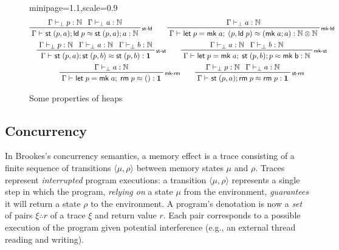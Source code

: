 \documentclass[acmsmall,screen,anonymous,review]{acmart}
\newcommand{\mb}[1]{\ensuremath{\mathbf{#1}}}
\newcommand{\ms}[1]{\ensuremath{\mathsf{#1}}}
\newcommand{\nats}{\mathbb{N}}
\newcommand{\letexpr}[3]{\ensuremath{\ms{let}\;#1 = #2;\;#3}}
\newcommand{\rle}[1]{{\scriptsize\textsf{#1}}}
\newcommand{\hasty}[4]{#1 \vdash_{#2} #3: {#4}}
\newcommand{\teqv}{\approx}
\newcommand{\tmeq}[5]{#1 \vdash_{#2} #3 \teqv #4 : {#5}}
\newcommand{\tret}[2]{#1 \therefore #2}
\begin{document}
\begin{figure}
  \begin{adjustbox}{minipage=1.1\textwidth,scale=0.9}
  \begin{gather*}
    \prftree[r]{\rle{st-ld}}
      {\hasty{\Gamma}{\bot}{p}{\nats}}
      {\hasty{\Gamma}{\bot}{a}{\nats}}
      {\tmeq{\Gamma}{}{\ms{st}\;(p, a) ; \ms{ld}\;p}{\ms{st}\;(p, a) ; a}{\nats}}
    \qquad
    \prftree[r]{\rle{mk-ld}}
      {\hasty{\Gamma}{\bot}{a}{\nats}}
      {\tmeq{\Gamma}{}{\letexpr{p}{\ms{mk}\;a}{(p, \ms{ld}\;p)}}
                                                 {(\ms{mk}\;a; a)}
                                                 {\nats \otimes \nats}}
    \\
    \prftree[r]{\rle{st-st}}
      {\hasty{\Gamma}{\bot}{p}{\nats}}
      {\hasty{\Gamma}{\bot}{a}{\nats}}
      {\hasty{\Gamma}{\bot}{b}{\nats}}
      {\tmeq{\Gamma}{}{\ms{st}\;(p, a) ; \ms{st}\;(p, b)}{\ms{st}\;(p, b)}{\mb{1}}}
    \qquad
    \prftree[r]{\rle{mk-st}}
      {\hasty{\Gamma}{\bot}{a}{\nats}}
      {\hasty{\Gamma}{\bot}{b}{\nats}}
      {\tmeq{\Gamma}{}{\letexpr{p}{\ms{mk}\;a}{\ms{st}\;(p, b) ; p}}
                                                  {\ms{mk\;b}}
                                                  {\nats}}
    \\
    \prftree[r]{\rle{mk-rm}}
      {\hasty{\Gamma}{\bot}{a}{\nats}}
      {\tmeq{\Gamma}{}{\letexpr{p}{\ms{mk}\;a}{\ms{rm}\;p}}{()}{\mb{1}}}
    \qquad
    \prftree[r]{\rle{st-rm}}
      {\hasty{\Gamma}{\bot}{p}{\nats}}
      {\hasty{\Gamma}{\bot}{a}{\nats}}
      {\tmeq{\Gamma}{}{\ms{st}\;(p, a) ; \ms{rm}\;p}{\ms{rm}\;p}{\mb{1}}}
    \\
  \end{gather*}
  \end{adjustbox}
  \caption{Some properties of heaps}
  \label{fig:heap-eqns}
  \Description{}
\end{figure}

\subsection{Concurrency}

In Brookes's \cite{brookes-full-abstraction-96} concurrency semantics, a memory effect
is a trace consisting of a finite sequence of transitions $\langle \mu, \rho \rangle$ 
between memory states $\mu$ and $\rho$.
%
Traces represent \emph{interrupted} program executions: a transition $\langle \mu, \rho
\rangle$ represents a single step in which the program, \emph{relying on} a state $\mu$ from the
environment, \emph{guarantees} it will return a state $\rho$ to the environment.
%
A program's denotation is now a \emph{set} of pairs $\tret{\xi}{r}$ of a trace $\xi$ and
return value $r$. Each pair corresponds to a possible execution of the program
given potential interference (e.g., an external thread reading and writing).
\end{document}
